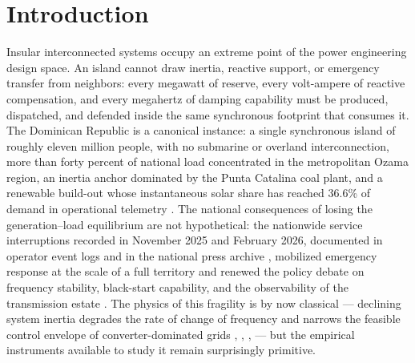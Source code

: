 \section{Introduction}
\label{sec:intro}

Insular interconnected systems occupy an extreme point of the power engineering design space. An island cannot draw inertia, reactive support, or emergency transfer from neighbors: every megawatt of reserve, every volt-ampere of reactive compensation, and every megahertz of damping capability must be produced, dispatched, and defended inside the same synchronous footprint that consumes it. The Dominican Republic is a canonical instance: a single synchronous island of roughly eleven million people, with no submarine or overland interconnection, more than forty percent of national load concentrated in the metropolitan Ozama region, an inertia anchor dominated by the Punta Catalina coal plant, and a renewable build-out whose instantaneous solar share has reached 36.6\% of demand in operational telemetry \cite{ocseni}. The national consequences of losing the generation--load equilibrium are not hypothetical: the nationwide service interruptions recorded in November 2025 and February 2026, documented in operator event logs \cite{ocseni} and in the national press archive \cite{listin2025}, mobilized emergency response at the scale of a full territory and renewed the policy debate on frequency stability, black-start capability, and the observability of the transmission estate \cite{blackout2004}. The physics of this fragility is by now classical \cite{kundur1994} --- declining system inertia degrades the rate of change of frequency and narrows the feasible control envelope of converter-dominated grids \cite{tielens2016}, \cite{milano2018}, \cite{dorfler2013}, \cite{hatziargyriou2021} --- but the empirical instruments available to study it remain surprisingly primitive.

